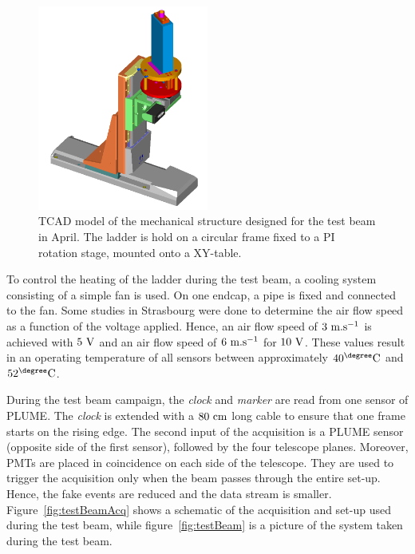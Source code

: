       \begin{figure}[!b]
        \centering
        \includegraphics[width = 0.5\textwidth]{Pictures/X0/Frame/Testbeam1.PNG}
        \caption{TCAD model of the mechanical structure designed for the test beam in April. The ladder is hold on a circular frame fixed to a PI rotation stage, mounted onto a XY-table.}
        \label{fig:mechanics}
      \end{figure}

      To control the heating of the ladder during the test beam, a cooling system consisting of a simple fan is used.
      On one endcap, a pipe is fixed and connected to the fan.
      Some studies in Strasbourg were done to determine the air flow speed as a function of the voltage applied.
      Hence, an air flow speed of $3~\rm{m.s^{-1}}$ is achieved with $5~\rm{V}$ and an air flow speed of $6~\rm{m.s^{-1}}$ for $10~\rm{V}$.
      These values result in an operating temperature of all sensors between approximately $40^{\degree}\rm{C}$ and $52^{\degree}\rm{C}$.

      During the test beam campaign, the \textit{clock} and \textit{marker} are read from one sensor of \gls{PLUME}.
      The \textit{clock} is extended with a $80~\rm{cm}$ long cable to ensure that one frame starts on the rising edge.
      The second input of the acquisition is a \gls{PLUME} sensor (opposite side of the first sensor), followed by the four telescope planes. 
      Moreover, \gls{PMT}s are placed in coincidence on each side of the telescope.
      They are used to trigger the acquisition only when the beam passes through the entire set-up.
      Hence, the fake events are reduced and the data stream is smaller.
      Figure~\ref{fig:testBeamAcq} shows a schematic of the acquisition and set-up used during the test beam, while figure~\ref{fig:testBeam} is a picture of the system taken during the test beam.

